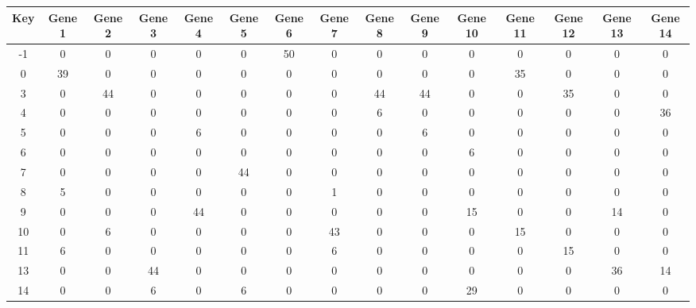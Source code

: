 \begin{tabular}{|c|c|c|c|c|c|c|c|c|c|c|c|c|c|c|}
\hline
Key & Gene 1 & Gene 2 & Gene 3 & Gene 4 & Gene 5 & Gene 6 & Gene 7 & Gene 8 & Gene 9 & Gene 10 & Gene 11 & Gene 12 & Gene 13 & Gene 14 \\
\hline
-1 & 0 & 0 & 0 & 0 & 0 & 50 & 0 & 0 & 0 & 0 & 0 & 0 & 0 & 0 \\
0 & 39 & 0 & 0 & 0 & 0 & 0 & 0 & 0 & 0 & 0 & 35 & 0 & 0 & 0 \\
3 & 0 & 44 & 0 & 0 & 0 & 0 & 0 & 44 & 44 & 0 & 0 & 35 & 0 & 0 \\
4 & 0 & 0 & 0 & 0 & 0 & 0 & 0 & 6 & 0 & 0 & 0 & 0 & 0 & 36 \\
5 & 0 & 0 & 0 & 6 & 0 & 0 & 0 & 0 & 6 & 0 & 0 & 0 & 0 & 0 \\
6 & 0 & 0 & 0 & 0 & 0 & 0 & 0 & 0 & 0 & 6 & 0 & 0 & 0 & 0 \\
7 & 0 & 0 & 0 & 0 & 44 & 0 & 0 & 0 & 0 & 0 & 0 & 0 & 0 & 0 \\
8 & 5 & 0 & 0 & 0 & 0 & 0 & 1 & 0 & 0 & 0 & 0 & 0 & 0 & 0 \\
9 & 0 & 0 & 0 & 44 & 0 & 0 & 0 & 0 & 0 & 15 & 0 & 0 & 14 & 0 \\
10 & 0 & 6 & 0 & 0 & 0 & 0 & 43 & 0 & 0 & 0 & 15 & 0 & 0 & 0 \\
11 & 6 & 0 & 0 & 0 & 0 & 0 & 6 & 0 & 0 & 0 & 0 & 15 & 0 & 0 \\
13 & 0 & 0 & 44 & 0 & 0 & 0 & 0 & 0 & 0 & 0 & 0 & 0 & 36 & 14 \\
14 & 0 & 0 & 6 & 0 & 6 & 0 & 0 & 0 & 0 & 29 & 0 & 0 & 0 & 0 \\
\hline
\end{tabular}